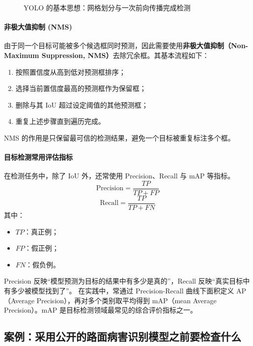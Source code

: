 \begin{figure}[H]
  \centering
  
  \caption{YOLO 的基本思想：网格划分与一次前向传播完成检测}
  \label{fig:ch09_orig16}
\end{figure}

\paragraph{非极大值抑制 (NMS)}
由于同一个目标可能被多个候选框同时预测，因此需要使用\textbf{非极大值抑制（Non-Maximum Suppression, NMS）}去除冗余框。其基本流程如下：
\begin{enumerate}
    \item 按照置信度从高到低对预测框排序；
    \item 选择当前置信度最高的预测框作为保留框；
    \item 删除与其 IoU 超过设定阈值的其他预测框；
    \item 重复上述步骤直到遍历完成。
\end{enumerate}

NMS 的作用是只保留最可信的检测结果，避免一个目标被重复标注多个框。

\paragraph{目标检测常用评估指标}
在检测任务中，除了 IoU 外，还常使用 Precision、Recall 与 mAP 等指标。
\begin{equation}
\text{Precision} = \frac{TP}{TP+FP}
\end{equation}
\begin{equation}
\text{Recall} = \frac{TP}{TP+FN}
\end{equation}
其中：
\begin{itemize}
    \item $TP$：真正例；
    \item $FP$：假正例；
    \item $FN$：假负例。
\end{itemize}

Precision 反映“模型预测为目标的结果中有多少是真的”，Recall 反映“真实目标中有多少被模型找到了”。
在实践中，常通过 Precision-Recall 曲线下面积定义 AP（Average Precision），再对多个类别取平均得到 mAP（mean Average Precision）。mAP 是目标检测领域最常见的综合评价指标之一。

\subsection{案例：采用公开的路面病害识别模型之前要检查什么}

